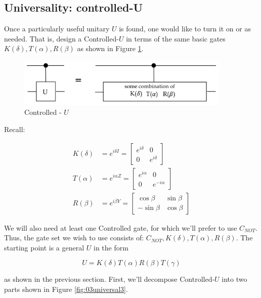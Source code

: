 \documentclass[main.tex]{subfiles}
\begin{document}
\subsection{Universality: controlled-U}

    Once a particularly useful unitary $U$ is found, one would like to turn it on or as needed. That is, design a Controlled-$U$ in terms of the same basic gates $K(\delta), T(\alpha), R(\beta)$ as shown in Figure \ref{fig:02universal2}.
    
    \begin{figure}
        \centering
        \includegraphics[width=4in]{notes/figs/n09/02universal2.png}
        \caption{Controlled - $U$}
        \label{fig:02universal2}
    \end{figure}
    
    Recall:
    
    $$
    \begin{aligned}
    K(\delta) &=e^{i \delta I}=\left[\begin{array}{cc}
    e^{i \delta} & 0 \\
    0 & e^{i \delta}
    \end{array}\right] \\
    T(\alpha) &=e^{i \alpha Z}=\left[\begin{array}{cc}
    e^{i \alpha} & 0 \\
    0 & e^{-i \alpha}
    \end{array}\right] \\
    R(\beta) &=e^{i \beta Y}=\left[\begin{array}{cc}
    \cos \beta & \sin \beta \\
    -\sin \beta & \cos \beta
    \end{array}\right]
    \end{aligned}
    $$
    
    We will also need at least one Controlled gate, for which we'll prefer to use $C_{NOT}$. Thus, the gate set we wish to use consists of: $C_{NOT}, K(\delta), T(\alpha), R(\beta)$. The starting point is a general $U$ in the form
    
    $$
    U=K(\delta) T(\alpha) R(\beta) T(\gamma)
    $$
    
    as shown in the previous section. First, we'll decompose Controlled-$U$ into two parts shown in Figure \ref{fig:03universal3}.
\end{document}
